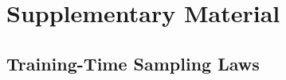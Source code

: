 \appendix{}

\chapter{Supplementary Material}\label{app:derivations}\label{app:supplementary}

\section{Training-Time Sampling Laws}\label{app:training-time-laws}



